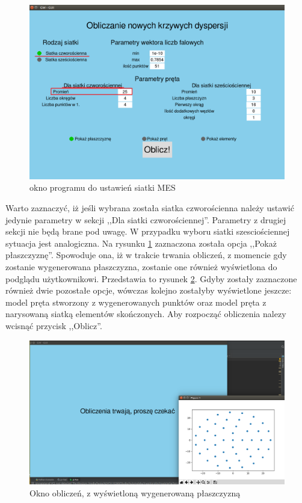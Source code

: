 \begin{figure}[h]
\centering
\includegraphics[width=13cm]{Zdjecia/5/kasia/srednica25}
\caption{okno programu do ustawień siatki MES}
\label{fig:srednica25}
\end{figure}

Warto zaznaczyć, iż jeśli wybrana została siatka czworościenna należy ustawić jedynie parametry w sekcji ,,Dla siatki czworościennej''. Parametry z drugiej sekcji nie będą brane pod uwagę. W przypadku wyboru siatki szesciościennej sytuacja jest analogiczna. Na rysunku \ref{fig:srednica25} zaznaczona została opcja ,,Pokaż płaszczyznę''. Spowoduje ona, iż w trakcie trwania obliczeń, z momencie gdy zostanie wygenerowana płaszczyzna, zostanie one również wyświetlona do podglądu użytkownikowi. Przedstawia to rysunek \ref{fig:plaszczyzna}. Gdyby zostały zaznaczone również dwie pozostałe opcje, wówczas kolejno zostałyby wyświetlone jeszcze: model pręta stworzony z wygenerowanych punktów oraz model pręta z narysowaną siatką elementów skończonych. Aby rozpocząć obliczenia nalezy wcisnąć przycisk ,,Oblicz''.

\begin{figure}[h]
\centering
\includegraphics[width=13cm]{Zdjecia/5/kasia/plaszczyzna}
\caption{Okno obliczeń, z wyświetloną wygenerowaną płaszczyzną}
\label{fig:plaszczyzna}
\end{figure}

